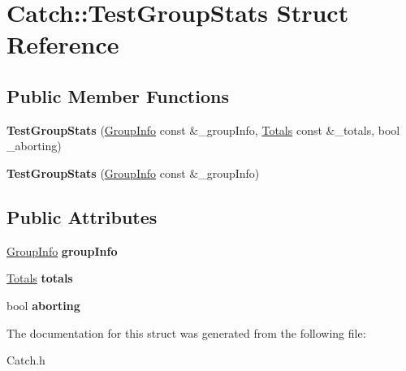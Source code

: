 \hypertarget{struct_catch_1_1_test_group_stats}{\section{Catch\-:\-:Test\-Group\-Stats Struct Reference}
\label{struct_catch_1_1_test_group_stats}
}
\subsection*{Public Member Functions}
\begin{DoxyCompactItemize}
\item 
\hypertarget{struct_catch_1_1_test_group_stats_aa3b01aa722be787059bca806e4f10be4}{{\bfseries Test\-Group\-Stats} (\hyperlink{struct_catch_1_1_group_info}{Group\-Info} const \&\-\_\-group\-Info, \hyperlink{struct_catch_1_1_totals}{Totals} const \&\-\_\-totals, bool \-\_\-aborting)}\label{struct_catch_1_1_test_group_stats_aa3b01aa722be787059bca806e4f10be4}

\item 
\hypertarget{struct_catch_1_1_test_group_stats_a2b2bb846beeb23d4dd20b1f5cd7e92bb}{{\bfseries Test\-Group\-Stats} (\hyperlink{struct_catch_1_1_group_info}{Group\-Info} const \&\-\_\-group\-Info)}\label{struct_catch_1_1_test_group_stats_a2b2bb846beeb23d4dd20b1f5cd7e92bb}

\end{DoxyCompactItemize}
\subsection*{Public Attributes}
\begin{DoxyCompactItemize}
\item 
\hypertarget{struct_catch_1_1_test_group_stats_a61c3692541a33e959ad5a0053cdc001b}{\hyperlink{struct_catch_1_1_group_info}{Group\-Info} {\bfseries group\-Info}}\label{struct_catch_1_1_test_group_stats_a61c3692541a33e959ad5a0053cdc001b}

\item 
\hypertarget{struct_catch_1_1_test_group_stats_a625961cf25978cc0736acc3fe6e60928}{\hyperlink{struct_catch_1_1_totals}{Totals} {\bfseries totals}}\label{struct_catch_1_1_test_group_stats_a625961cf25978cc0736acc3fe6e60928}

\item 
\hypertarget{struct_catch_1_1_test_group_stats_a9e172443a3da84c8845a831f102a74db}{bool {\bfseries aborting}}\label{struct_catch_1_1_test_group_stats_a9e172443a3da84c8845a831f102a74db}

\end{DoxyCompactItemize}


The documentation for this struct was generated from the following file\-:\begin{DoxyCompactItemize}
\item 
Catch.\-h\end{DoxyCompactItemize}
